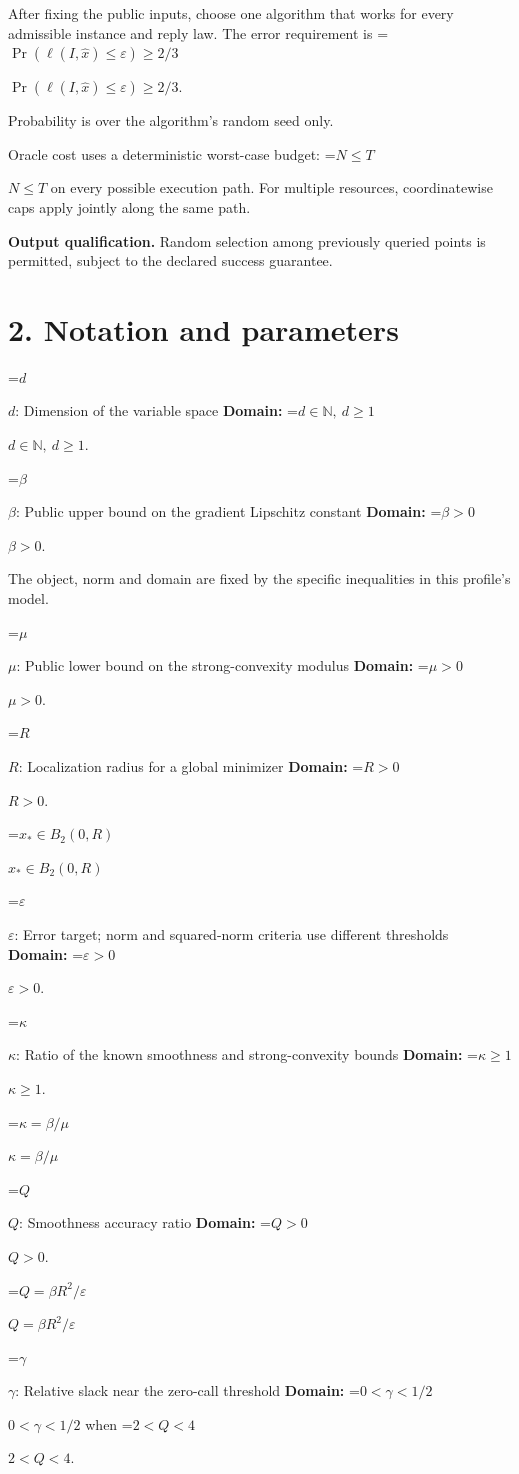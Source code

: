 \documentclass[10pt,a4paper]{article}
\newcommand{\AtlasMath}[1]{\par\begingroup\centering\setbox0=\hbox{$\displaystyle #1$}\ifdim\wd0>1.4\linewidth\typeout{ATLAS WIDE FORMULA: \the\wd0}\fi\ifdim\wd0>\linewidth\resizebox{\linewidth}{!}{\box0}\else\box0\fi\par\endgroup}
\newcommand{\AtlasInlineMath}[1]{\begingroup\setbox0=\hbox{$#1$}\ifdim\wd0>.4\linewidth\endgroup\AtlasMath{#1}\else\endgroup$#1$\fi}
\begin{document}
After fixing the public inputs, choose one algorithm that works for every admissible instance and reply law. The error requirement is \AtlasInlineMath{\Pr(\ell(I,\widehat{x})\le \varepsilon)\ge2/3}.

Probability is over the algorithm's random seed only.

Oracle cost uses a deterministic worst-case budget: \AtlasInlineMath{N\le T} on every possible execution path. For multiple resources, coordinatewise caps apply jointly along the same path.

\textbf{Output qualification.} Random selection among previously queried points is permitted, subject to the declared success guarantee.

\section{2. Notation and parameters}
\AtlasInlineMath{d}: Dimension of the variable space \textbf{Domain:} \AtlasInlineMath{d\in\mathbb{N},\ d\ge1}.

\AtlasInlineMath{\beta}: Public upper bound on the gradient Lipschitz constant \textbf{Domain:} \AtlasInlineMath{\beta>0}.

The object, norm and domain are fixed by the specific inequalities in this profile's model.

\AtlasInlineMath{\mu}: Public lower bound on the strong-convexity modulus \textbf{Domain:} \AtlasInlineMath{\mu>0}.

\AtlasInlineMath{R}: Localization radius for a global minimizer \textbf{Domain:} \AtlasInlineMath{R>0}.

\AtlasInlineMath{x_*\in B_2(0,R)}

\AtlasInlineMath{\varepsilon}: Error target; norm and squared-norm criteria use different thresholds \textbf{Domain:} \AtlasInlineMath{\varepsilon>0}.

\AtlasInlineMath{\kappa}: Ratio of the known smoothness and strong-convexity bounds \textbf{Domain:} \AtlasInlineMath{\kappa\ge1}.

\AtlasInlineMath{\kappa=\beta/\mu}

\AtlasInlineMath{Q}: Smoothness accuracy ratio \textbf{Domain:} \AtlasInlineMath{Q>0}.

\AtlasInlineMath{Q=\beta R^2/\varepsilon}

\AtlasInlineMath{\gamma}: Relative slack near the zero-call threshold \textbf{Domain:} \AtlasInlineMath{0<\gamma<1/2} when \AtlasInlineMath{2<Q<4}.
\end{document}

